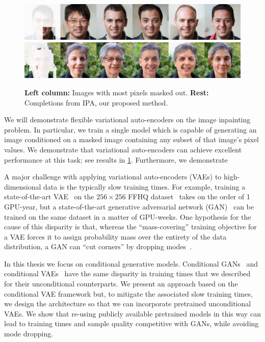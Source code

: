 \begin{figure}[t]
  \centering
  \includegraphics[width=\textwidth]{figs/cigcvae/qual/0_0_patches-4.png}
  \includegraphics[width=\textwidth]{figs/cigcvae/qual/59_2_3_modddd.png}
  \caption{\textbf{Left column:} Images with most pixels masked out.
    \textbf{Rest:} Completions from IPA, our proposed method.
  }
  \label{fig:cigcvae-headline}
\end{figure}

We will demonstrate flexible variational auto-encoders on the image inpainting problem. In particular, we train a single model which is capable of generating an image conditioned on a masked image containing any subset of that image's pixel values. We demonstrate that variational auto-encoders can achieve excellent performance at this task; see results in \cref{fig:cigcvae-headline}. Furthermore, we demonstrate



A major challenge with applying variational auto-encoders (VAEs) to
high-dimensional data is the typically slow training times. For example,
training a state-of-the-art VAE~\citep{vahdat2020nvae,child2020very} on the
$256\times256$ FFHQ dataset~\citep{karras2019style} takes on the order of 1
GPU-year, but a state-of-the-art generative adversarial network
(GAN)~\citep{lin2021anycost,karras2020analyzing} can be trained on the same
dataset in a matter of GPU-weeks. One hypothesis for the cause of this disparity
is that, whereas the ``mass-covering'' training objective for a VAE forces it to
assign probability mass over the entirety of the data distribution, a GAN can
``cut corners'' by dropping modes~\citep{arora2017gans,arora2017generalization}.

In this thesis we focus on conditional generative models. Conditional
GANs~\citep{zheng2019pluralistic,zhao2021large} and conditional
VAEs~\citep{sohn2015learning,ivanov2018variational} have the same disparity in training times that we described for their
unconditional counterparts. We present an approach based on the conditional VAE
framework but, to mitigate the associated slow training times, we design the
architecture so that we can incorporate pretrained unconditional VAEs. We show
that re-using publicly available pretrained models in this way can lead to
training times and sample quality competitive with GANs, while avoiding mode
dropping.


